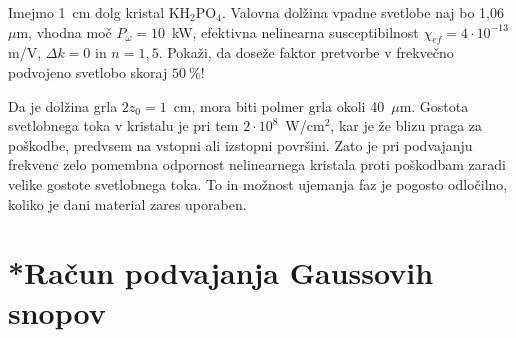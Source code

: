 \documentclass[11pt,fleqn]{book} %
\begin{document}
\begin{definition}
Imejmo 1~cm dolg kristal KH$_{2}$PO$_{4}$. Valovna dolžina vpadne svetlobe 
naj bo 1,06~$\mu$m, vhodna moč $P_\omega = 10$~kW, efektivna nelinearna susceptibilnost
$\chi_{ef}=4\cdot10^{-13}~$m/V, $\Delta k=0$ in $n=1,5$. Pokaži, da doseže
faktor pretvorbe v frekvečno podvojeno svetlobo skoraj $50~\%$! 


Da je dolžina grla $2z_{0}=1$~cm, mora biti polmer
grla okoli 40~$\mu$m. Gostota svetlobnega toka v kristalu je pri
tem $2\cdot10^{8}$~W/cm$^{2}$, kar je že blizu praga za poškodbe,
predvsem na vstopni ali izstopni površini. Zato je pri podvajanju frekvenc
zelo pomembna odpornost nelinearnega kristala proti poškodbam
zaradi velike gostote svetlobnega toka. To in možnost ujemanja faz je pogosto
odločilno, koliko je dani material zares uporaben. 
\end{definition}

\section{{*}Račun podvajanja Gaussovih snopov}
\end{document}
